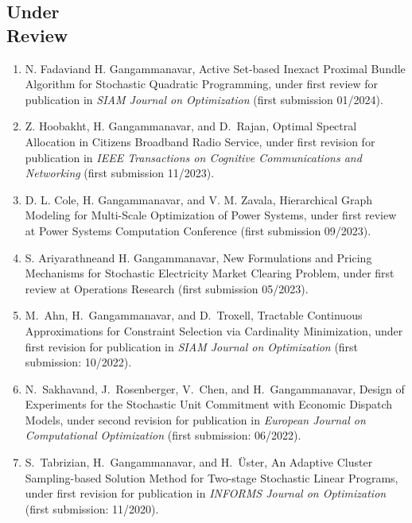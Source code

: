 \documentclass[hyperref, margin]{myResume}
\newif\ifpublic
\begin{document}
\begin{resume}
\section{Under\\Review}
\begin{enumerate}[label=R\arabic*., leftmargin=*] 
	\item N. Fadavi\footnotemark[1] and H. Gangammanavar, Active Set-based Inexact Proximal Bundle Algorithm for Stochastic Quadratic Programming, \ifpublic 2024 (first review). \else under first review for publication in \textit{SIAM Journal on Optimization} (first submission 01/2024)\fi.
	\item Z. Hoobakht\footnotemark[3], H. Gangammanavar, and D.\ Rajan, Optimal Spectral Allocation in Citizens Broadband Radio Service, \ifpublic 2023 (first review). \else under first revision for publication in \textit{IEEE Transactions on Cognitive Communications and Networking} (first submission 11/2023).\fi
	\item D. L. Cole, H. Gangammanavar, and V. M. Zavala, Hierarchical Graph Modeling for Multi-Scale Optimization of Power Systems, \ifpublic 2023 (first review). \else under first review at Power Systems Computation Conference (first submission 09/2023).\fi
	\item S. Ariyarathne\footnotemark[1] and H. Gangammanavar, New Formulations and Pricing Mechanisms for Stochastic Electricity Market Clearing Problem, \ifpublic 2023 (first review). \else under first review at Operations Research (first submission 05/2023).\fi
	\item M.\ Ahn, H.\ Gangammanavar, and D.\ Troxell\footnotemark[3], Tractable Continuous Approximations for Constraint Selection via Cardinality Minimization, \ifpublic 2022 (under second review). \else under first revision for publication in \textit{SIAM Journal on Optimization} (first submission: 10/2022).\fi
	\item N.\ Sakhavand\footnotemark[3], J.\ Rosenberger, V.\ Chen, and H.\ Gangammanavar, Design of Experiments for the Stochastic Unit Commitment with Economic Dispatch Models, \ifpublic 2022 (under second revision). \else under second revision for publication in \textit{European Journal on Computational Optimization} (first submission: 06/2022). \fi 
	\item S.\ Tabrizian\footnotemark[1], H.\ Gangammanavar, and H.\ \"{U}ster, An Adaptive Cluster Sampling-based Solution Method for Two-stage Stochastic Linear Programs, \ifpublic 2020. \else under first revision for publication in \textit{INFORMS Journal on Optimization} (first submission: 11/2020). \fi
\end{enumerate}


\end{resume}
\end{document}
